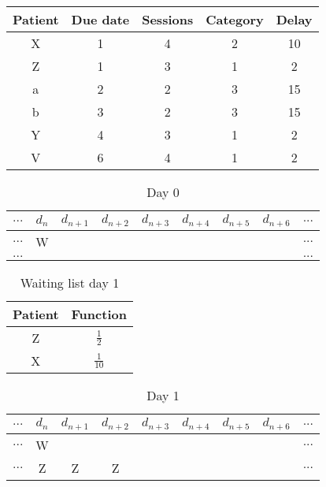 \begin{table}
\centering
\begin{tabular}{|c|c|c|c|c|}
	\hline
	Patient & Due date & Sessions & Category & Delay\\
	\hline
	X & 1 & 4 & 2 & 10\\
	\hline
	Z & 1 & 3 & 1 & 2\\
	\hline
	a & 2 & 2 & 3 & 15\\
	\hline
	b & 3 & 2 & 3 & 15\\
	\hline
	Y & 4 & 3 & 1 & 2\\
	\hline
	V & 6 & 4 & 1 & 2\\
	\hline
\end{tabular}
\end{table}

\begin{table}
\centering
\begin{tabular}{|c|c|c|c|c|c|c|c|c|}
	\multicolumn{1}{c}{$...$} & \multicolumn{1}{c}{$d_n$} & \multicolumn{1}{c}{$d_{n+1}$} & \multicolumn{1}{c}{$d_{n+2}$} & \multicolumn{1}{c}{$d_{n+3}$} & \multicolumn{1}{c}{$d_{n+4}$} & \multicolumn{1}{c}{$d_{n+5}$} & \multicolumn{1}{c}{$d_{n+6}$} & \multicolumn{1}{c}{$...$}\\
	\hline
	$...$ & W &   &   &   &   &   &   & $...$\\
	\hline
	$...$ &   &   &   &   &   &   &   & $...$\\
	\hline
\end{tabular}
\caption{Day 0}
\end{table}

\begin{table}
\centering
\begin{tabular}{|c|c|}
	\hline
	Patient & Function\\
	\hline
	Z & $\frac{1}{2}$\\
	\hline
	X & $\frac{1}{10}$ \\
	\hline
\end{tabular}
\caption{Waiting list day 1}
\end{table}

\begin{table}
\centering
\begin{tabular}{|c|c|c|c|c|c|c|c|c|}
	\multicolumn{1}{c}{$...$} & \multicolumn{1}{c}{$d_n$} & \multicolumn{1}{c}{$d_{n+1}$} & \multicolumn{1}{c}{$d_{n+2}$} & \multicolumn{1}{c}{$d_{n+3}$} & \multicolumn{1}{c}{$d_{n+4}$} & \multicolumn{1}{c}{$d_{n+5}$} & \multicolumn{1}{c}{$d_{n+6}$} & \multicolumn{1}{c}{$...$}\\
	\hline
	$...$ & W &   &   &   &   &   &   & $...$\\
	\hline
	$...$ & Z & Z & Z &   &   &   &   & $...$\\
	\hline
\end{tabular}
\caption{Day 1}
\end{table}

